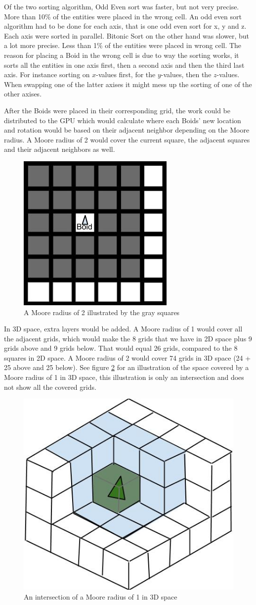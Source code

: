 Of the two sorting algorithm, Odd Even sort was faster, but not very precise. More than 10\% of the entities were placed in the wrong cell. An odd even sort algorithm had to be done for each axis, that is one odd even sort for x, y and z. Each axis were sorted in parallel.
Bitonic Sort on the other hand was slower, but a lot more precise. Less than 1\% of the entities were placed in wrong cell. The reason for placing a Boid in the wrong cell is due to way the sorting works, it sorts all the entities in one axis first, then a second axis and then the third last axis. For instance sorting on $x$-values first, for the $y$-values, then the $z$-values. When swapping one of the latter axises it might mess up the sorting of one of the other axises.

After the Boids were placed in their corresponding grid, the work could be distributed to the GPU which would calculate where each Boids' new location and rotation would be based on their adjacent neighbor depending on the Moore radius. A Moore radius of 2 would cover the current square, the adjacent squares and their adjacent neighbors as well.
\begin{figure}[H]
    \centering
    \includegraphics[width=0.3\linewidth]{images/moore}
    \caption[Moore radius illustrated, 2D]{A Moore radius of 2 illustrated by the gray squares}\label{fig:moore}
\end{figure}
In 3D space, extra layers would be added. A Moore radius of 1 would cover all the adjacent grids, which would make the 8 grids that we have in 2D space plus 9 grids above and 9 grids below. That would equal 26 grids, compared to the 8 squares in 2D space. A Moore radius of 2 would cover 74 grids in 3D space (24 + 25 above and 25 below). See figure \ref{fig:3dgrid} for an illustration of the space covered by a Moore radius of 1 in 3D space, this illustration is only an intersection and does not show all the covered grids.
\begin{figure}[H]
    \centering
    \includegraphics[width=0.5\linewidth]{images/3dgrid}
    \caption[Moore radius illustrated in 3D space]{An intersection of a Moore radius of 1 in 3D space}\label{fig:3dgrid}
\end{figure}

